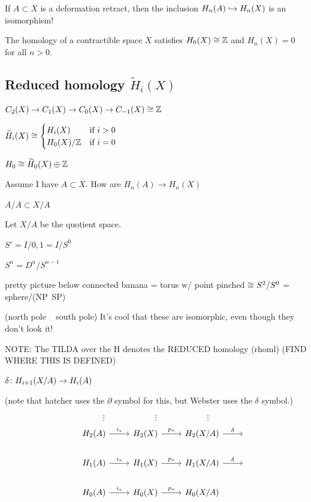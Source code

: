 \documentclass[11pt,leqno,oneside]{amsart}
\numberwithin{thm}{section}
\newcommand{\homl}[1][n]{H_{#1}}
\newcommand{\rhoml}[1][n]{\widetilde{H}_{#1}}
\begin{document}
If $A \subset X$ is a deformation retract, then the inclusion $\homl(A) \into \homl(X)$ is an isomorphism!

\begin{thm}
  The homology of a contractible space $X$ satisfies $H_0(X) \mathrel{\cong} {\mathbb Z}$ and $\homl(X) = 0$ for all $n > 0$.
\end{thm}

\subsection{Reduced homology $\rhoml[i](X)$}

$C_2(X) \to C_1(X) \to C_0(X) \to C_{-1}(X) \mathrel{\cong} {\mathbb Z}$

$\rhoml[i](X) \isom
\begin{cases}
  H_i(X) &\text{if $i > 0$} \\
  H_0(X)/\Z &\text{if $i=0$}
\end{cases}$

$H_0 \isom \rhoml[0](X) \dsum \Z$

Assume I have $A \subset X$.  How are $\homl(A) \to \homl(X)$

$A/A \subset X/A$

Let $X/A$ be the quotient space.

$S' = I/{0,1} = I/S^0$

$S^n = D^n/S^{n-1}$

pretty picture below
connected banana = torus w/ point pinched $\mathrel{\cong} S^2/S^0$ = sphere/(NP~SP)

(north pole ~ south pole)
It's cool that these are isomorphic, even though they don't look it!

NOTE:  The TILDA over the H denotes the REDUCED homology (rhoml) (FIND WHERE THIS IS DEFINED)



\begin{thm}
  $\delta \colon H_{i+1}(X/A) \to H_i(A)$

  (note that hatcher uses the $\partial$ symbol for this, but Webster uses the $\delta$ symbol.)
\end{thm}
\begin{example}
  $$\vdots\qquad\qquad\qquad\vdots\qquad\qquad\qquad\vdots$$
  $$\begin{tikzcd}
    &\homl[2](A) \arrow[r, "i_*"] &\homl[2](X) \arrow[r, "p_*"] &\homl[2](X/A) \arrow[r, "\delta"] &~ \\
    &\homl[1](A) \arrow[r, "i_*"] &\homl[1](X) \arrow[r, "p_*"] &\homl[1](X/A) \arrow[r, "\delta"] &~ \\
    &\homl[0](A) \arrow[r, "i_*"] &\homl[0](X) \arrow[r, "p_*"] &\homl[0](X/A)                     &~
  \end{tikzcd}$$
\end{example}
\end{document}
